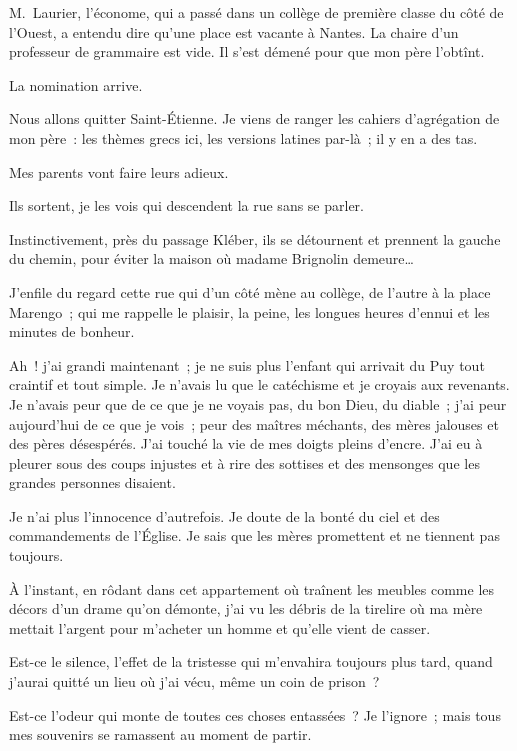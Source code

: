 \documentclass[french,twoside]{book} %
\begin{document}
\noindent M. Laurier, l’économe, qui a passé dans un collège de première classe du côté de l’Ouest, a entendu dire qu’une place est vacante à Nantes. La chaire d’un professeur de grammaire est vide. Il s’est démené pour que mon père l’obtînt.\par
\bigbreak
\noindent La nomination arrive.\par
\bigbreak
\noindent Nous allons quitter Saint-Étienne. Je viens de ranger les cahiers d’agrégation de mon père : les thèmes grecs ici, les versions latines par-là ; il y en a des tas.\par
Mes parents vont faire leurs adieux.\par
Ils sortent, je les vois qui descendent la rue sans se parler.\par
Instinctivement, près du passage Kléber, ils se détournent et prennent la gauche du chemin, pour éviter la maison où madame Brignolin demeure…\par
\bigbreak
\noindent J’enfile du regard cette rue qui d’un côté mène au collège, de l’autre à la place Marengo ; qui me rappelle le plaisir, la peine, les longues heures d’ennui et les minutes de bonheur.\par
Ah ! j’ai grandi maintenant ; je ne suis plus l’enfant qui arrivait du Puy tout craintif et tout simple. Je n’avais lu que le catéchisme et je croyais aux revenants. Je n’avais peur que de ce que je ne voyais pas, du bon Dieu, du diable ; j’ai peur aujourd’hui de ce que je vois ; peur des maîtres méchants, des mères jalouses et des pères désespérés. J’ai touché la vie de mes doigts pleins d’encre. J’ai eu à pleurer sous des coups injustes et à rire des sottises et des mensonges que les grandes personnes disaient.\par
Je n’ai plus l’innocence d’autrefois. Je doute de la bonté du ciel et des commandements de l’Église. Je sais que les mères promettent et ne tiennent pas toujours.\par
À l’instant, en rôdant dans cet appartement où traînent les meubles comme les décors d’un drame qu’on démonte, j’ai vu les débris de la tirelire où ma mère mettait l’argent pour m’acheter un homme et qu’elle vient de casser.\par
Est-ce le silence, l’effet de la tristesse qui m’envahira toujours plus tard, quand j’aurai quitté un lieu où j’ai vécu, même un coin de prison ?\par
Est-ce l’odeur qui monte de toutes ces choses entassées ? Je l’ignore ; mais tous mes souvenirs se ramassent au moment de partir.\par
\end{document}
